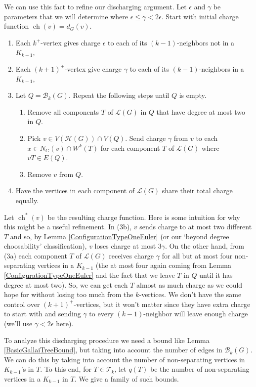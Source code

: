 \documentclass[12pt]{article}
\theoremstyle{plain}
\theoremstyle{definition}
\theoremstyle{remark}
\newcommand{\fancy}[1]{\mathcal{#1}}
\newcommand{\T}{\fancy{T}}
\newcommand{\B}{\fancy{B}}
\renewcommand{\L}{\fancy{L}}
\newcommand{\HH}{\fancy{H}}
\newcommand{\ch}{\operatorname{ch}}
\begin{document}
We can use this fact to refine our discharging argument.  Let $\epsilon$ and $\gamma$ be parameters that we will determine where $\epsilon \le \gamma < 2\epsilon$. Start with initial charge function $\ch(v) = d_G(v)$.  
\begin{enumerate}
	\item Each $k^+$-vertex gives charge $\epsilon$ to each of its $(k-1)$-neighbors not in a $K_{k-1}$,
	\item Each $(k+1)^+$-vertex give charge $\gamma$ to each of its $(k-1)$-neighbors in a $K_{k-1}$,
	\item Let $Q = \B_k(G)$.  Repeat the following steps until $Q$ is empty.
	  \begin{enumerate}
	  	\item Remove all components $T$ of $\L(G)$ in $Q$ that have degree at most two in $Q$.
	  	\item Pick $v \in V(\HH(G)) \cap V(Q)$.  Send charge $\gamma$ from $v$ to each $x \in N_G(v) \cap W^k(T)$ for each component $T$ of $\L(G)$ where $vT \in E(Q)$.
	  	\item Remove $v$ from $Q$.
	  \end{enumerate}
	\item Have the vertices in each component of $\L(G)$ share their total charge equally.
\end{enumerate}
Let $\ch^*(v)$ be the resulting charge function.  Here is some intuition for why this might be a useful refinement.  In (3b), $v$ sends charge to at most two different $T$ and so, by Lemma \ref{ConfigurationTypeOneEuler} (or our `beyond degree choosability' classification), $v$ loses charge at most $3\gamma$.  On the other hand, from (3a) each component $T$ of $\L(G)$ receives charge $\gamma$ for all but at most four non-separating vertices in a $K_{k-1}$ (the at most four again coming from Lemma \ref{ConfigurationTypeOneEuler} and the fact that we leave $T$ in $Q$ until it has degree at most two).  So, we can get each $T$ almost as much charge as we could hope for without losing too much from the $k$-vertices.  We don't have the same control over $(k+1)^+$-vertices, but it won't matter since they have extra charge to start with and sending $\gamma$ to every $(k-1)$-neighbor will leave enough charge (we'll use $\gamma < 2\epsilon$ here).

To analyze this discharging procedure we need a bound like Lemma \ref{BasicGallaiTreeBound}, but taking into account the number of edges in $\B_k(G)$.  We can do this by taking into account the number of non-separating vertices in $K_{k-1}$'s in $T$.  To this end, for $T \in \T_k$, let $q(T)$ be the number of non-separating vertices in a $K_{k-1}$ in $T$.  We give a family of such bounds.
\end{document}
